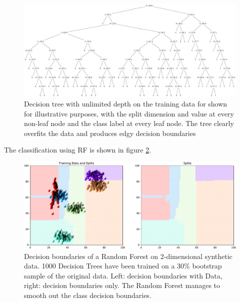 \documentclass[10pt]{article}
\begin{document}
\begin{figure}[H]
    \centering
    \includegraphics[width=\textwidth]{decision_tree}
    \caption{Decision tree with unlimited depth on the training data for shown for illustrative purposes, with the split dimension and value at every non-leaf node and the class label at every leaf node. The tree clearly overfits the data and produces edgy decision boundaries}
    \label{fig:decision_tree}
\end{figure}
The classification using \acrlong{RF} is shown in figure \ref{fig:rf}.

\begin{figure}[H]
    \centering
    \includegraphics[width=\textwidth]{rf}
    \caption{Decision boundaries of a Random Forest on 2-dimensional synthetic data. 1000 Decision Trees have been trained on a 30\% bootstrap sample of the original data. Left: decision boundaries with Data, right: decision boundaries only. The Random Forest manages to smooth  out the class decision boundaries.}
    \label{fig:rf}
\end{figure}
\end{document}
